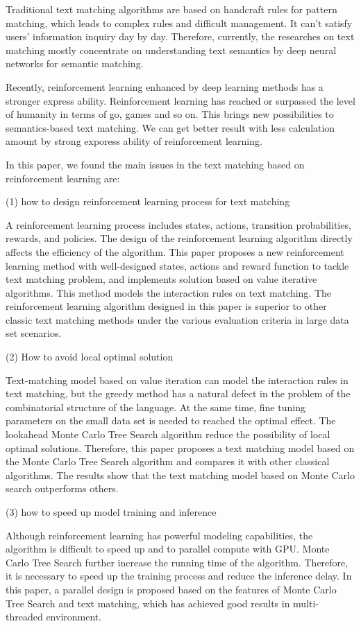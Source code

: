Traditional text matching algorithms are based on handcraft rules for pattern matching, which leads to complex rules and difficult management. It can’t satisfy users’ information inquiry day by day. Therefore, currently, the researches on text matching mostly concentrate on understanding text semantics by deep neural networks for semantic matching.

Recently, reinforcement learning enhanced by deep learning methods has a stronger express ability. Reinforcement learning has reached or surpassed the level of humanity in terms of go, games and so on. This brings new possibilities to semantics-based text matching. We can get better result with less calculation amount by strong exporess ability of reinforcement learning.

In this paper, we found the main issues in the text matching based on reinforcement learning are:

(1) how to design reinforcement learning process for text matching

A reinforcement learning process includes states, actions, transition probabilities, rewards, and policies. The design of the reinforcement learning algorithm directly affects the efficiency of the algorithm. This paper proposes a new reinforcement learning method with well-designed states, actions and reward function to tackle text matching problem, and implements solution based on value iterative algorithms. This method models the interaction rules on text matching. The reinforcement learning algorithm designed in this paper is superior to other classic text matching methods under the various evaluation criteria in large data set scenarios.

(2) How to avoid local optimal solution

Text-matching model based on value iteration can model the interaction rules in text matching, but the greedy method has a natural defect in the problem of the combinatorial structure of the language. At the same time, fine tuning parameters on the small data set is needed to reached the optimal effect. The lookahead Monte Carlo Tree Search algorithm reduce the possibility of local optimal solutions. Therefore, this paper proposes a text matching model based on the Monte Carlo Tree Search algorithm and compares it with other classical algorithms. The results show that the text matching model based on Monte Carlo search outperforms others.

(3) how to speed up model training and inference

Although reinforcement learning has powerful modeling capabilities, the algorithm is difficult to speed up and to parallel compute with GPU. Monte Carlo Tree Search further increase the running time of the algorithm. Therefore, it is necessary to speed up the training process and reduce the inference delay. In this paper, a parallel design is proposed based on the features of Monte Carlo Tree Search and text matching, which has achieved good results in multi-threaded environment.

